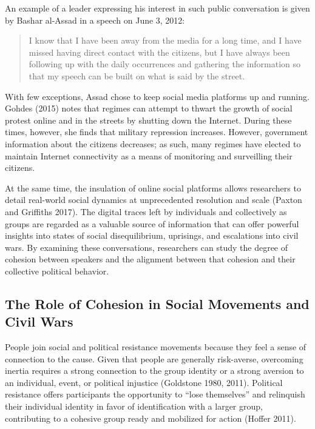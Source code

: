 \documentclass[
  english,
  man]{apa6}
\begin{document}
An example of a leader expressing his interest in such public
conversation is given by Bashar al-Assad in a speech on June 3, 2012:

\begin{quote}
I know that I have been away from the media for a long time, and I have missed
having direct contact with the citizens, but I have always been following up
with the daily occurrences and gathering the information so that my speech can
be built on what is said by the street.
\end{quote}

\noindent With few exceptions, Assad chose to keep social media platforms up and running.
Gohdes (2015) notes that regimes can attempt to thwart the growth
of social protest online and in the streets by shutting down the Internet.
During these times, however, she finds that military repression increases.
However, government information about the citizens decreases; as such, many
regimes have elected to maintain Internet connectivity as a means of monitoring
and surveilling their citizens.

At the same time, the insulation of online social platforms allows researchers
to detail real-world social dynamics at unprecedented resolution and scale
(Paxton and Griffiths 2017). The digital traces left by individuals and collectively as
groups are regarded as a valuable source of information that can offer powerful
insights into states of social disequilibrium, uprisings, and escalations into
civil wars. By examining these conversations, researchers can study the degree
of cohesion between speakers and the alignment between that cohesion and their
collective political behavior.

\hypertarget{the-role-of-cohesion-in-social-movements-and-civil-wars}{%
\subsection{The Role of Cohesion in Social Movements and Civil Wars}\label{the-role-of-cohesion-in-social-movements-and-civil-wars}}

People join social and political resistance movements because they feel a sense
of connection to the cause. Given that people are generally risk-averse, overcoming inertia
requires a strong connection to the group identity or a strong aversion to an
individual, event, or political injustice (Goldstone 1980, 2011). Political resistance offers participants the
opportunity to \enquote{lose themselves} and relinquish their individual identity in
favor of identification with a larger group, contributing to a cohesive
group ready and mobilized for action (Hoffer 2011).
\end{document}
